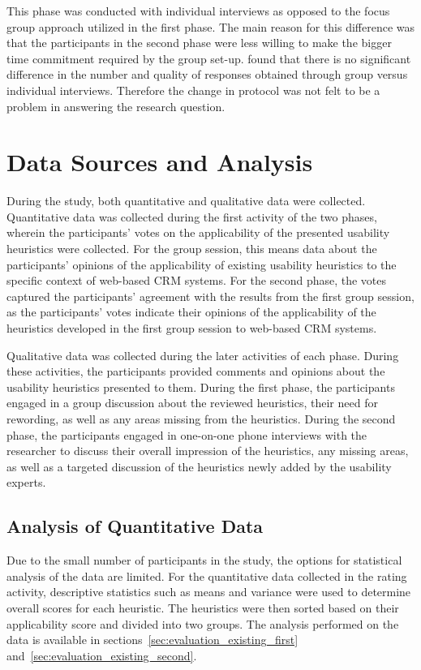 This phase was conducted with individual interviews as opposed to the focus group approach utilized in the first phase. The main reason for this difference was that the participants in the second phase were less willing to make the bigger time commitment required by the group set-up.  found that there is no significant difference in the number and quality of responses obtained through group versus individual interviews. Therefore the change in protocol was not felt to be a problem in answering the research question.

\section{Data Sources and Analysis}
During the study, both quantitative and qualitative data were collected. Quantitative data was collected during the first activity of the two phases, wherein the participants' votes on the applicability of the presented usability heuristics were collected. For the group session, this means data about the participants' opinions of the applicability of existing usability heuristics to the specific context of web-based CRM systems. For the second phase, the votes captured the participants' agreement with the results from the first group session, as the participants' votes indicate their opinions of the applicability of the heuristics developed in the first group session to web-based CRM systems.

Qualitative data was collected during the later activities of each phase. During these activities, the participants provided comments and opinions about the usability heuristics presented to them. During the first phase, the participants engaged in a group discussion about the reviewed heuristics, their need for rewording, as well as any areas missing from the heuristics. During the second phase, the participants engaged in one-on-one phone interviews with the researcher to discuss their overall impression of the heuristics, any missing areas, as well as a targeted discussion of the heuristics newly added by the usability experts.

\subsection{Analysis of Quantitative Data}
Due to the small number of participants in the study, the options for statistical analysis of the data are limited. For the quantitative data collected in the rating activity, descriptive statistics such as means and variance were used to determine overall scores for each heuristic. The heuristics were then sorted based on their applicability score and divided into two groups. The analysis performed on the data is available in sections~\ref{sec:evaluation_existing_first} and~\ref{sec:evaluation_existing_second}.

